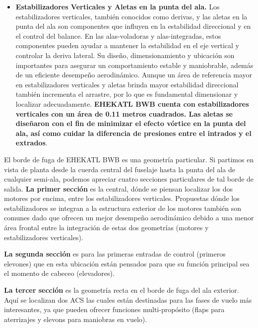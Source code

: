 \begin{itemize}
    \item \textbf{Estabilizadores Verticales y Aletas en la punta del ala.} Los estabilizadores verticales, también conocidos como derivas, y las aletas en la punta del ala son componentes que influyen en la estabilidad direccional y en el control del balance. En las alas-voladoras y alas-integradas, estos componentes pueden ayudar a mantener la estabilidad en el eje vertical y controlar la deriva lateral. Su diseño, dimensionamiento y ubicación son importantes para asegurar un comportamiento estable y maniobrable, además de un eficiente desempeño aerodinámico. Aunque un área de referencia mayor en estabilizadores verticales y aletas brinda mayor estabilidad direccional también incrementa el arrastre, por lo que es fundamental dimensionar y localizar adecuadamente. \textbf{EHEKATL BWB cuenta con estabilizadores verticales con un área de 0.11 metros cuadrados. Las aletas se diseñaron con el fin de minimizar el efecto vórtice en la punta del ala, así como cuidar la diferencia de presiones entre el intrados y el extrados}. 
\end{itemize}


El borde de fuga de EHEKATL BWB es una geometría particular. Si partimos en vista de planta desde la cuerda central del fuselaje hasta la punta del ala de cualquier semi-ala, podemos apreciar cuatro secciones particulares de tal borde de salida.
\textbf{La primer sección} es la central, dónde se piensan localizar los dos motores por encima, entre los estabilizadores verticales. Propuestas dónde los estabilizadores se integran a la estructura exterior de los motores también son comunes dado que ofrecen un mejor desempeño aerodinámico debido a una menor área frontal entre la integración de estas dos geometrías (motores y estabilizadores verticales).

\textbf{La segunda sección} es para las primeras entradas de control (primeros elevones) que en esta ubicación están pensados para que su función principal sea el momento de cabeceo (elevadores).

\textbf{La tercer sección} es la geometría recta en el borde de fuga del ala exterior. Aquí se localizan dos ACS las cuales están destinadas para las fases de vuelo más interesantes, ya que pueden ofrecer funciones multi-propósito (flaps para aterrizajes y elevons para maniobras en vuelo). 

